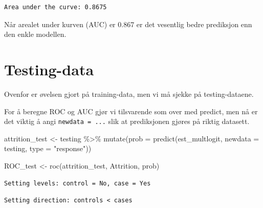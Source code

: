 \documentclass[
  letterpaper,
  DIV=11,
  numbers=noendperiod]{scrreprt}
\newenvironment{Shaded}{\begin{snugshade}}{\end{snugshade}}
\newcommand{\AttributeTok}[1]{\textcolor[rgb]{0.40,0.45,0.13}{#1}}
\newcommand{\DecValTok}[1]{\textcolor[rgb]{0.68,0.00,0.00}{#1}}
\newcommand{\FunctionTok}[1]{\textcolor[rgb]{0.28,0.35,0.67}{#1}}
\newcommand{\NormalTok}[1]{\textcolor[rgb]{0.00,0.23,0.31}{#1}}
\newcommand{\OtherTok}[1]{\textcolor[rgb]{0.00,0.23,0.31}{#1}}
\newcommand{\SpecialCharTok}[1]{\textcolor[rgb]{0.37,0.37,0.37}{#1}}
\newcommand{\StringTok}[1]{\textcolor[rgb]{0.13,0.47,0.30}{#1}}
\begin{document}
\begin{verbatim}
Area under the curve: 0.8675
\end{verbatim}

Når arealet under kurven (AUC) er 0.867 er det vesentlig bedre
prediksjon enn den enkle modellen.

\section{Testing-data}\label{testing-data}

Ovenfor er øvelsen gjort på training-data, men vi må sjekke på
testing-dataene.

For å beregne ROC og AUC gjør vi tilsvarende som over med predict, men
nå er det viktig å angi \texttt{newdata\ =\ ...} slik at prediksjonen
gjøres på riktig datasett.

\begin{Shaded}
\begin{Highlighting}[]
\NormalTok{attrition\_test }\OtherTok{\textless{}{-}}\NormalTok{ testing }\SpecialCharTok{\%\textgreater{}\%}
  \FunctionTok{mutate}\NormalTok{(}\AttributeTok{prob =} \FunctionTok{predict}\NormalTok{(est\_multlogit, }\AttributeTok{newdata =}\NormalTok{ testing, }\AttributeTok{type =} \StringTok{"response"}\NormalTok{))}
\end{Highlighting}
\end{Shaded}

\begin{Shaded}
\begin{Highlighting}[]
\NormalTok{ROC\_test }\OtherTok{\textless{}{-}} \FunctionTok{roc}\NormalTok{(attrition\_test, Attrition, prob)}
\end{Highlighting}
\end{Shaded}

\begin{verbatim}
Setting levels: control = No, case = Yes
\end{verbatim}

\begin{verbatim}
Setting direction: controls < cases
\end{verbatim}

\begin{Shaded}
\end{Shaded}
\end{document}
